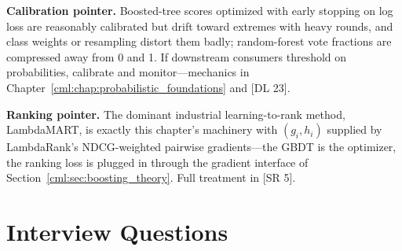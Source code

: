 \textbf{Calibration pointer.} Boosted-tree scores optimized with early stopping on log loss are reasonably calibrated but drift toward extremes with heavy rounds, and class weights or resampling distort them badly; random-forest vote fractions are compressed away from 0 and 1. If downstream consumers threshold on probabilities, calibrate and monitor---mechanics in Chapter~\ref{cml:chap:probabilistic_foundations} and [DL 23].

\textbf{Ranking pointer.} The dominant industrial learning-to-rank method, LambdaMART, is exactly this chapter's machinery with $(g_i, h_i)$ supplied by LambdaRank's NDCG-weighted pairwise gradients---the GBDT is the optimizer, the ranking loss is plugged in through the gradient interface of Section~\ref{cml:sec:boosting_theory}. Full treatment in [SR 5].

\section{Interview Questions}
\label{cml:sec:trees_interview}

